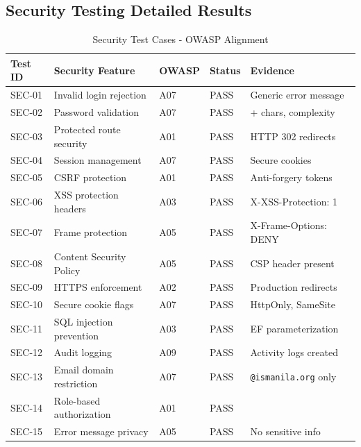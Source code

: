 \subsection{Security Testing Detailed Results}

\begin{table}[h!]
\centering
\caption{Security Test Cases - OWASP Alignment}
\label{tab:appendix_security_tests}
\renewcommand{\arraystretch}{1.15}
\setlength{\tabcolsep}{4pt}
\begin{tabularx}{\textwidth}{@{}
  >{\RaggedLeft\arraybackslash}p{1.2cm}
  >{\RaggedRight\arraybackslash}p{4.2cm}
  >{\RaggedLeft\arraybackslash}p{1.5cm}
  >{\RaggedLeft\arraybackslash}p{1.5cm}
  >{\RaggedRight\arraybackslash}X
@{}}
\toprule
\textbf{Test ID} & \textbf{Security Feature} & \textbf{OWASP} & \textbf{Status} & \textbf{Evidence} \\
\midrule
SEC-01 & Invalid login rejection & A07 & PASS & Generic error message \\
SEC-02 & Password validation & A07 & PASS & 8+ chars, complexity \\
SEC-03 & Protected route security & A01 & PASS & HTTP 302 redirects \\
SEC-04 & Session management & A07 & PASS & Secure cookies \\
SEC-05 & CSRF protection & A01 & PASS & Anti-forgery tokens \\
SEC-06 & XSS protection headers & A03 & PASS & X-XSS-Protection: 1 \\
SEC-07 & Frame protection & A05 & PASS & X-Frame-Options: DENY \\
SEC-08 & Content Security Policy & A05 & PASS & CSP header present \\
SEC-09 & HTTPS enforcement & A02 & PASS & Production redirects \\
SEC-10 & Secure cookie flags & A07 & PASS & HttpOnly, SameSite \\
SEC-11 & SQL injection prevention & A03 & PASS & EF parameterization \\
SEC-12 & Audit logging & A09 & PASS & Activity logs created \\
SEC-13 & Email domain restriction & A07 & PASS & \texttt{@ismanila.org} only \\
SEC-14 & Role-based authorization & A01 & PASS & [Authorize(Roles)] \\
SEC-15 & Error message privacy & A05 & PASS & No sensitive info \\
\bottomrule
\end{tabularx}
\end{table}

